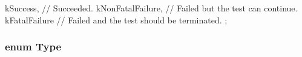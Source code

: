\begin{DoxyCode}
            {
    kSuccess,          // Succeeded.
    kNonFatalFailure,  // Failed but the test can continue.
    kFatalFailure      // Failed and the test should be terminated.
  };
\end{DoxyCode}
\hypertarget{classtesting_1_1TestPartResult_a1d1cfd8ffb84e947f82999c682b666a7}{
\subsubsection[{\-Type}]{\setlength{\rightskip}{0pt plus 5cm}enum {\bf \-Type}}}\label{d9/d98/classtesting_1_1TestPartResult_a1d1cfd8ffb84e947f82999c682b666a7}
